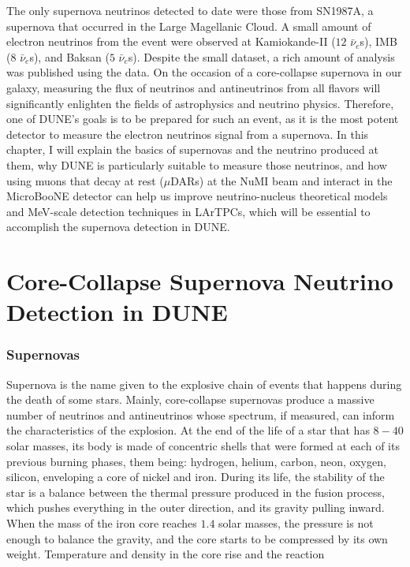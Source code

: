 The only supernova neutrinos detected to date were those from SN1987A, a supernova that occurred in the Large Magellanic Cloud. A small amount of electron neutrinos from the event were observed at Kamiokande-II ($12$ $\bar{\nu}_e$s), IMB ($8$ $\bar{\nu}_e$s), and Baksan ($5$ $\bar{\nu}_e$s). Despite the small dataset, a rich amount of analysis was published using the data\cite{Kamiokande-II-PRL, Kamiokande-II-PRD, IMB, Baksan}. 
 On the occasion of a core-collapse supernova in our galaxy, measuring the flux of neutrinos and antineutrinos from all flavors will significantly enlighten the fields of astrophysics and neutrino physics. Therefore, one of DUNE's goals is to be prepared for such an event, as it is the most potent detector to measure the electron neutrinos signal from a supernova\cite{dune_SAND}.
 In this chapter, I will explain the basics of supernovas and the neutrino produced at them, why DUNE is particularly suitable to measure those neutrinos, and how using muons that decay at rest ($\mu$DARs) at the NuMI beam and interact in the MicroBooNE detector can help us improve neutrino-nucleus theoretical models and MeV-scale detection techniques in LArTPCs, which will be essential to accomplish the supernova detection in DUNE. 

\section{Core-Collapse Supernova Neutrino Detection in DUNE}
\subsubsection{Supernovas}
Supernova is the name given to the explosive chain of events that happens during the death of some stars. Mainly, core-collapse supernovas produce a massive number of neutrinos and antineutrinos whose spectrum, if measured, can inform the characteristics of the explosion. 
At the end of the life of a star that has $8-40$ solar masses, its body is made of concentric shells that were formed at each of its previous burning phases, them being: hydrogen, helium, carbon, neon, oxygen, silicon, enveloping a core of nickel and iron. During its life, the stability of the star is a balance between the thermal pressure produced in the fusion process, which pushes everything in the outer direction, and its gravity pulling inward. When the mass of the iron core reaches $1.4$ solar masses, the pressure is not enough to balance the gravity, and the core starts to be compressed by its own weight. Temperature and density in the core rise and the reaction

